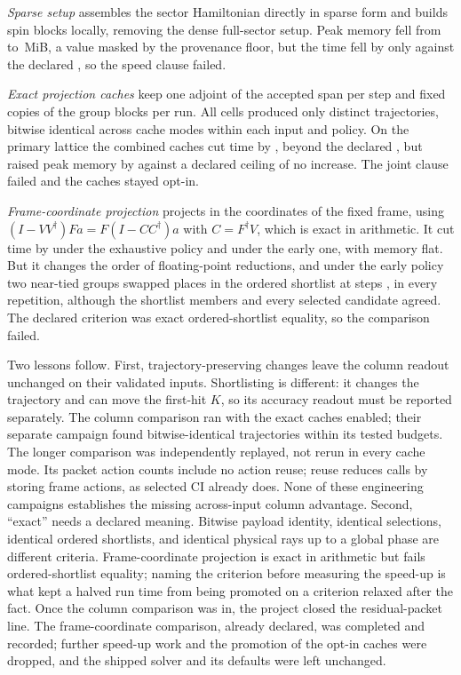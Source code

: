 \documentclass[aps,pra,reprint,superscriptaddress,nofootinbib,floatfix,
  showkeys,raggedbottom]{revtex4-2}
\begin{document}
\emph{Sparse setup} assembles the sector Hamiltonian directly in sparse form
and builds spin blocks locally, removing the dense full-sector setup. Peak
memory fell from \pkSparseRssBefore{} to \pkSparseRssAfter{}\,MiB, a value
masked by the provenance floor, but the time fell by only
\pkSparseReduction{} against the declared \pkSparseDeclaredReduction{}, so the
speed clause failed.

\emph{Exact projection caches} keep one adjoint of the accepted span per step
and fixed copies of the group blocks per run. All \pkCacheCells{} cells
produced only \pkCachePayloads{} distinct trajectories, bitwise identical
across cache modes within each input and policy. On the primary lattice the
combined caches cut time by \pkCacheReduction{}, beyond the declared
\pkCacheMinimumReduction{}, but raised peak memory by \pkCacheRssGrowth{}
against a declared ceiling of no increase. The joint clause failed and the
caches stayed opt-in.

\emph{Frame-coordinate projection} projects in the coordinates of the fixed
frame, using $(I-VV^\dagger)Fa=F(I-CC^\dagger)a$ with $C=F^\dagger V$, which is
exact in arithmetic. It cut time by \pkCoordinateExhaustiveReduction{} under
the exhaustive policy and \pkCoordinateEarlyReduction{} under the early one,
with memory flat. But it changes the order of floating-point reductions, and
under the early policy two near-tied groups swapped places in the ordered
shortlist at steps \pkCoordinateSwapSteps{}, in every repetition, although
the shortlist members and every selected candidate agreed. The declared
criterion was exact ordered-shortlist equality, so the comparison failed.

Two lessons follow. First, trajectory-preserving changes leave the column
readout unchanged on their validated inputs. Shortlisting is different: it
changes the trajectory and can move the first-hit $K$, so its accuracy readout
must be reported separately. The column comparison ran with the exact caches
enabled; their separate campaign found bitwise-identical trajectories within
its tested budgets. The longer comparison was independently replayed, not
rerun in every cache mode. Its packet action counts include no action reuse;
reuse reduces calls by storing frame actions, as selected CI already does.
None of these engineering campaigns establishes the missing across-input
column advantage. Second,
``exact'' needs a declared meaning. Bitwise payload identity, identical
selections, identical ordered shortlists, and identical physical rays up to a
global phase are different criteria. Frame-coordinate projection is exact in
arithmetic but fails ordered-shortlist equality; naming the criterion before
measuring the speed-up is what kept a halved run time from being promoted on a
criterion relaxed after the fact. Once the column comparison was in, the
project closed the residual-packet line. The frame-coordinate comparison,
already declared, was completed and recorded; further speed-up work and the
promotion of the opt-in caches were dropped, and the shipped solver and its
defaults were left unchanged.
\end{document}
